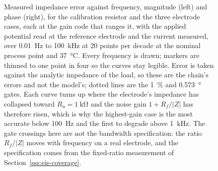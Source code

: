 \begin{figure}[htbp]
{}
  \caption[{Measured impedance error against frequency for four loads.}]{Measured
  impedance error against frequency, magnitude (left) and phase (right),
  for the calibration resistor and the three electrode cases, each at the gain
  code that ranges it, with the applied potential read at the reference electrode
  and the current measured, over \SI{0.01}{\hertz} to \SI{100}{\kilo\hertz} at
  \num{20} points per decade at the nominal process point and \SI{37}{\celsius}. Every
  frequency is drawn; markers are thinned to one point in four so the curves stay
  legible. Error is taken against the analytic impedance of the
  load, so these are the chain's errors and not the model's; dotted lines are the
  \SI{1}{\percent} and \SI{0.573}{\degree} gates. Each curve turns up where the
  electrode's impedance has collapsed toward \(R_u = \SI{1}{\kilo\ohm}\) and the
  noise gain \(1 + R_f/|Z|\) has therefore risen, which is why the highest-gain
  case is the most accurate below \SI{100}{\hertz} and the first to degrade above
  \SI{1}{\kilo\hertz}. The gate crossings here are not the bandwidth
  specification: the ratio \(R_f/|Z|\) moves with frequency on a real electrode,
  and the specification comes from the fixed-ratio measurement of
  Section~\ref{sss:eis-coverage}.}
  \label{fig:eis-error}
\end{figure}
